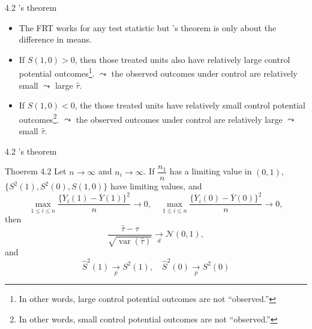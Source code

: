 \documentclass[aspectratio=169, 12pt]{beamer}
\begin{document}
\begin{frame}{4.2 \citet{neyman1923application}'s theorem}
  \begin{itemize}
    \item The FRT works for any test statistic but \citet{neyman1923application}'s theorem is only about the difference in means.
    \item If $S(1,0)>0$, then those treated units also have relatively large control potential outcomes\footnote{In other words, large control potential outcomes are not ``observed.''}. $\leadsto$ the observed outcomes under control are relatively small $\leadsto$ large $\widehat{\tau}$.
    \item If $S(1,0)<0$, the those treated units have relatively small control potential outcomes\footnote{In other words, small control potential outcomes are not ``observed.''}. $\leadsto$ the observed outcomes under control are relatively large $\leadsto$ small $\widehat{\tau}$.
  \end{itemize}
\end{frame}

\begin{frame}{4.2 \citet{neyman1923application}'s theorem}
  \begin{keybox}{Thoerem 4.2}
    Let $n\to \infty$ and $n_i\to \infty$. If $\dfrac{n_1}{n}$ has a limiting value in $(0,1)$, $\{S^2(1), S^2(0), S(1,0)\}$ have limiting values, and 
    \begin{equation}
      \max_{1\leq i\leq n}\frac{\{Y_i(1)-\overline{Y}(1)\}^2}{n}\to 0,\quad \max_{1\leq i\leq n}\frac{\{Y_i(0)-\overline{Y}(0)\}^2}{n}\to 0,
      \label{eq:thm4.2-1}
    \end{equation}
    then 
    \begin{equation}
      \frac{\widehat{\tau}-\tau}{\sqrt{\operatorname{var}(\widehat{\tau})}}\xrightarrow[d]{}\mathcal{N}(0,1),
      \label{eq:thm4.2-2}
    \end{equation}
    and
    \begin{equation}
      \widehat{S}^2(1)\xrightarrow[p]{}S^2(1), \quad \widehat{S}^2(0)\xrightarrow[p]{}S^2(0)
      \label{eq:thm4.2-3}
    \end{equation}
    \label{thm4.2}
  \end{keybox}
\end{frame}
\end{document}
